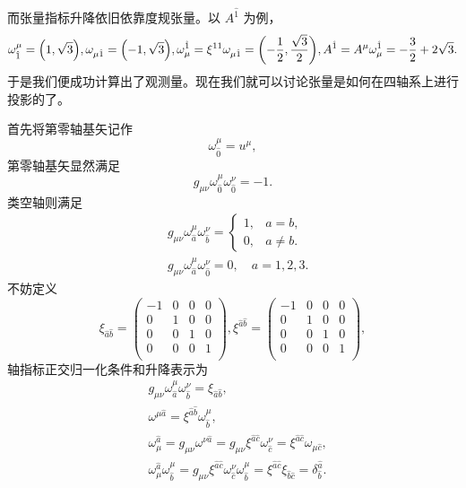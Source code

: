\documentclass[UTF8, 12pt, a4paper, oneside, onecolumn, fontset=none]{ctexart}
\begin{document}
而张量指标升降依旧依靠度规张量。以 $A^{\hat{1}}$ 为例，
\begin{align}
\omega^{\mu}_{\hat{1}}=\mleft(1,\sqrt{3}\mright),\omega_{\mu\hat{1}}=\mleft(-1,\sqrt{3}\mright),\omega^{\hat{1}}_{\mu}=\xi^{11}\omega_{\mu\hat{1}}=\mleft(-\frac{1}{2},\frac{\sqrt{3}}{2}\mright), A^{\hat{1}}=A^{\mu}\omega_{\mu}^{\hat{1}}=-\frac{3}{2}+2\sqrt{3}.
\end{align}
于是我们便成功计算出了观测量。现在我们就可以讨论张量是如何在四轴系上进行投影的了。

首先将第零轴基矢记作
\begin{equation}
\omega^{\mu}_{\hat{0}}=u^{\mu},
\end{equation}
第零轴基矢显然满足
\begin{equation}
g_{\mu\nu}\omega^{\mu}_{\hat{0}}\omega^{\nu}_{\hat{0}}=-1.
\end{equation}
类空轴则满足
\begin{align}
&g_{\mu\nu}\omega^{\mu}_{\hat{a}}\omega^{\nu}_{\hat{b}}=
\begin{cases}
1,&a=b,\\
0,&a\ne b.
\end{cases}\\
&g_{\mu\nu}\omega^{\mu}_{\hat{a}}\omega^{\nu}_{\hat{0}}=0,\quad a=1, 2, 3.
\end{align}
不妨定义
\begin{equation}
\xi_{\hat{a}\hat{b}}=\begin{pmatrix}
-1 & 0 & 0 & 0\\
0 & 1 & 0 & 0\\
0 & 0 & 1 & 0\\
0 & 0 & 0 & 1\\
\end{pmatrix},\xi^{\hat{a}\hat{b}}=\begin{pmatrix}
-1 & 0 & 0 & 0\\
0 & 1 & 0 & 0\\
0 & 0 & 1 & 0\\
0 & 0 & 0 & 1\\
\end{pmatrix},
\end{equation}
轴指标正交归一化条件和升降表示为
\begin{align}
&g_{\mu\nu}\omega^{\mu}_{\hat{a}}\omega^{\nu}_{\hat{b}}=\xi_{\hat{a}\hat{b}},\\
&\omega^{\mu\hat{a}}=\xi^{\hat{a}\hat{b}}\omega^{\mu}_{\hat{b}},\\
&\omega_{\mu}^{\hat{a}}=g_{\mu\nu}\omega^{\nu\hat{a}}=g_{\mu\nu}\xi^{\hat{a}\hat{c}}\omega^{\nu}_{\hat{c}}=\xi^{\hat{a}\hat{c}}\omega_{\mu\hat{c}},\\
&\omega^{\hat{a}}_{\mu}\omega^{\mu}_{\hat{b}}=g_{\mu\nu}\xi^{\hat{a}\hat{c}}\omega^{\nu}_{\hat{c}}\omega^{\mu}_{\hat{b}}=\xi^{\hat{a}\hat{c}}\xi_{\hat{b}\hat{c}}=\delta^{\hat{a}}_{\hat{b}}.
\end{align}
\end{document}
